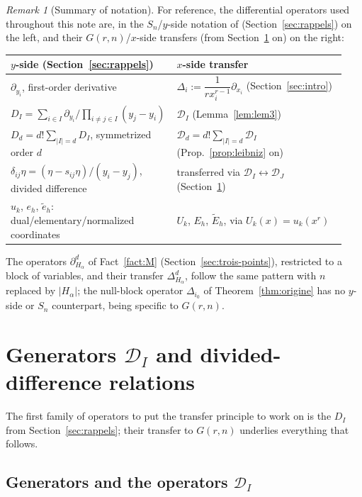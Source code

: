 \documentclass[11pt]{article}
\theoremstyle{remark}
\newtheorem{remark}[theorem]{Remark}
\begin{document}
\begin{remark}[Summary of notation]\label{rem:notation}
For reference, the differential operators used throughout this note are, in the $S_n$/$y$-side notation of \cite{Ze} (Section~\ref{sec:rappels}) on the left, and their $G(r,n)$/$x$-side transfers (from Section~\ref{sec:generators} on) on the right:
\begin{center}
\small
\begin{tabular}{@{}p{0.44\linewidth}p{0.5\linewidth}@{}}
$y$-side (Section~\ref{sec:rappels}) & $x$-side transfer \\ \hline
$\partial_{y_i}$, first-order derivative & $\Delta_i:=\dfrac{1}{rx_i^{r-1}}\partial_{x_i}$ (Section~\ref{sec:intro}) \\[2pt]
$D_I=\sum_{i\in I}\partial_{y_i}/\prod_{i\ne j\in I}(y_j-y_i)$ & $\mathcal D_I$ (Lemma~\ref{lem:lem3}) \\[2pt]
$D_d=d!\sum_{|I|=d}D_I$, symmetrized order $d$ & $\mathcal D_d=d!\sum_{|I|=d}\mathcal D_I$ (Prop.~\ref{prop:leibniz} on) \\[2pt]
$\delta_{ij}\eta=(\eta-s_{ij}\eta)/(y_i-y_j)$, divided difference & transferred via $\mathcal D_I\leftrightarrow\mathcal D_J$ (Section~\ref{sec:generators}) \\[2pt]
$u_k$, $e_h$, $\widetilde e_h$: dual/elementary/normalized coordinates & $U_k$, $E_h$, $\widetilde E_h$, via $U_k(x)=u_k(x^r)$
\end{tabular}
\end{center}
The operators $\partial_{H_\alpha}^d$ of Fact~\ref{fact:M} (Section~\ref{sec:trois-points}), restricted to a block of variables, and their transfer $\Delta_{H_\alpha}^d$, follow the same pattern with $n$ replaced by $|H_\alpha|$; the null-block operator $\Delta_{i_0}$ of Theorem~\ref{thm:origine} has no $y$-side or $S_n$ counterpart, being specific to $G(r,n)$.
\end{remark}

\section{Generators \texorpdfstring{$\mathcal D_I$}{DI} and divided-difference relations}\label{sec:generators}

The first family of operators to put the transfer principle to work on is the $D_I$ from Section~\ref{sec:rappels}; their transfer to $G(r,n)$ underlies everything that follows.

\subsection{Generators and the operators \texorpdfstring{$\mathcal D_I$}{DI}}
\end{document}
